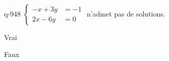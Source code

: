 \begin{truefalse}{q-948}
$\begin{cases}-x+3y &= -1 \\ 2x-6y &= 0\end{cases}$ n'admet pas de solutions.
\item* Vrai
\item Faux
\end{truefalse}

